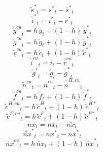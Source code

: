 \begin{dmath}
{{\tilde s^*}}_{t}={{s^*}}_{t}-{{\bar s^*}}_{t}
\end{dmath}
\begin{dmath}
{{\tilde i^*}}_{t}={{i^*}}_{t}-{{\bar r^*}}_{t}
\end{dmath}
\begin{dmath}
{{\tilde y^{cu}}}_{t}={{h}}\, {{\tilde y}}_{t}+\left(1-{{h}}\right)\, {{\tilde y^*}}_{t}
\end{dmath}
\begin{dmath}
{{\tilde g^{cu}}}_{t}={{h}}\, {{\tilde g}}_{t}+\left(1-{{h}}\right)\, {{\tilde g^*}}_{t}
\end{dmath}
\begin{dmath}
{{\tilde c^{cu}}}_{t}={{h}}\, {{\tilde c}}_{t}+\left(1-{{h}}\right)\, {{\tilde c^*}}_{t}
\end{dmath}
\begin{dmath}
{{\tilde i^{cu}}}_{t}={{i}}_{t}-{{\hat {\bar r}^{cu}}}_{t}
\end{dmath}
\begin{dmath}
{{\tilde g^{r}}}_{t}={{\tilde g}}_{t}-{{\tilde g^*}}_{t}
\end{dmath}
\begin{dmath}
{{\tilde n^{cu}}}_{t}={{\hat n^{cu}}}_{t}-{{\hat {\bar n}^{H,cu}}}_{t}
\end{dmath}
\begin{dmath}
{{\tilde f^{cu}}}_{t}={{h}}\, {{\tilde f}}_{t}+\left(1-{{h}}\right)\, {{\tilde f^*}}_{t}
\end{dmath}
\begin{dmath}
{{\tilde c^{H,cu}}}_{t}={{h}}\, {{\tilde c^H}}_{t}+\left(1-{{h}}\right)\, {{\tilde c^{H*}}}_{t}
\end{dmath}
\begin{dmath}
{{\tilde c^{F,cu}}}_{t}={{h}}\, {{\tilde c^F}}_{t}+\left(1-{{h}}\right)\, {{\tilde c^{F*}}}_{t}
\end{dmath}
\begin{dmath}
{{\tilde{nx}}}_{t}={{nx}}_{t}-{{\bar{nx}}}_{t}
\end{dmath}
\begin{dmath}
{{\tilde{nx}^*}}_{t}={{nx^*}}_{t}-{{\bar{nx}^*}}_{t}
\end{dmath}
\begin{dmath}
{{\tilde{nx}^{cu}}}_{t}={{h}}\, {{\tilde{nx}}}_{t}+\left(1-{{h}}\right)\, {{\tilde{nx}^*}}_{t}
\end{dmath}
